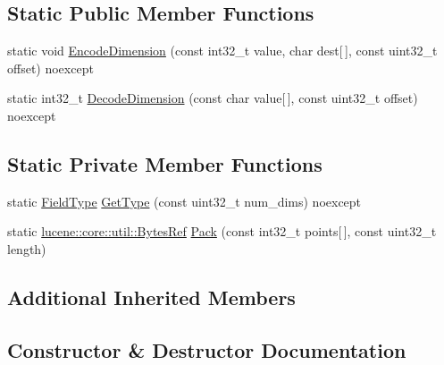 \subsection*{Static Public Member Functions}
\begin{DoxyCompactItemize}
\item 
static void \mbox{\hyperlink{classlucene_1_1core_1_1document_1_1IntPoint_a44c8e743c679988d9a8d42c353735d28}{Encode\+Dimension}} (const int32\+\_\+t value, char dest\mbox{[}$\,$\mbox{]}, const uint32\+\_\+t offset) noexcept
\item 
static int32\+\_\+t \mbox{\hyperlink{classlucene_1_1core_1_1document_1_1IntPoint_a29eaf7c0c579e416100f0cb16e622de7}{Decode\+Dimension}} (const char value\mbox{[}$\,$\mbox{]}, const uint32\+\_\+t offset) noexcept
\end{DoxyCompactItemize}
\subsection*{Static Private Member Functions}
\begin{DoxyCompactItemize}
\item 
static \mbox{\hyperlink{classlucene_1_1core_1_1document_1_1FieldType}{Field\+Type}} \mbox{\hyperlink{classlucene_1_1core_1_1document_1_1IntPoint_aea4e98fc61985c22e12bf248d1c4a1bc}{Get\+Type}} (const uint32\+\_\+t num\+\_\+dims) noexcept
\item 
static \mbox{\hyperlink{classlucene_1_1core_1_1util_1_1BytesRef}{lucene\+::core\+::util\+::\+Bytes\+Ref}} \mbox{\hyperlink{classlucene_1_1core_1_1document_1_1IntPoint_ab72dd15b82e4c9807910db3b2ac3a737}{Pack}} (const int32\+\_\+t points\mbox{[}$\,$\mbox{]}, const uint32\+\_\+t length)
\end{DoxyCompactItemize}
\subsection*{Additional Inherited Members}


\subsection{Constructor \& Destructor Documentation}
\mbox{\label{classlucene_1_1core_1_1document_1_1IntPoint_aa133857ccc70fbb2b8933d5ecaa46fb5}} 
